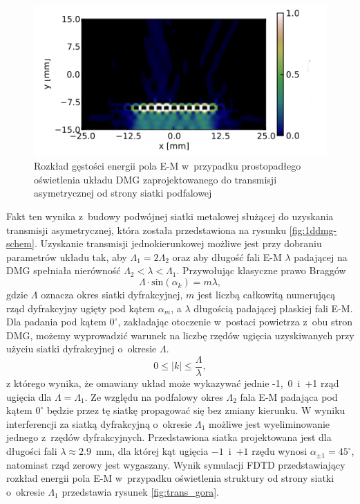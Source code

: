 \begin{figure}[tb]
	\includegraphics[width=\textwidth]{images/thz/opt_letters_dol.png}
	\caption{Rozkład gęstości energii pola E-M w~przypadku prostopadłego oświetlenia układu DMG zaprojektowanego do transmisji asymetrycznej od strony siatki podfalowej~\cite{Stolarek:13} }
	\label{fig:trans_dol}
\end{figure}

Fakt ten wynika z~budowy podwójnej siatki metalowej służącej do uzyskania transmisji asymetrycznej, która została przedstawiona na rysunku \ref{fig:1ddmg-schem}. Uzyskanie transmisji jednokierunkowej możliwe jest przy dobraniu parametrów układu tak, aby $\Lambda_1 = 2\Lambda_2$ oraz aby długość fali E-M $\lambda$ padającej na DMG  spełniała nierówność $\Lambda_2<\lambda<\Lambda_1$. Przywołując klasyczne prawo Braggów
\begin{equation}
	\Lambda \cdot \textrm{sin}(\alpha_k) = m \lambda,
\end{equation}
gdzie $\Lambda$ oznacza okres siatki dyfrakcyjnej, $m$ jest liczbą całkowitą numerującą rząd dyfrakcyjny ugięty pod kątem $\alpha_m$, a $\lambda$ długością padającej płaskiej fali E-M. Dla padania pod kątem $0^{\circ}$, zakładając otoczenie w~postaci powietrza z~obu stron DMG, możemy wyprowadzić warunek na liczbę rzędów ugięcia uzyskiwanych przy użyciu siatki dyfrakcyjnej o~okresie $\Lambda$. 
\begin{equation}
	 0 \le |k| \le \frac { \Lambda }{\lambda},
\end{equation}
z którego wynika, że omawiany układ może wykazywać jednie -1,~0~i~+1 rząd ugięcia dla  $\Lambda=\Lambda_1$. Ze względu na podfalowy okres $\Lambda_2$ fala E-M padająca pod kątem $0^{\circ}$ będzie przez tę siatkę propagować się bez zmiany kierunku.  W wyniku interferencji za siatką dyfrakcyjną o~okresie $\Lambda_1$ możliwe jest wyeliminowanie jednego z~rzędów dyfrakcyjnych. Przedstawiona siatka projektowana jest dla długości fali $\lambda \approx 2.9$~mm, dla której kąt ugięcia $-1$~i~$+1$ rzędu wynosi $\alpha_{\pm 1} = 45^{\circ}$, natomiast rząd zerowy jest wygaszany. Wynik symulacji FDTD przedstawiający rozkład energii pola E-M w~przypadku oświetlenia struktury od strony siatki o~okresie $\Lambda_1$ przedstawia rysunek \ref{fig:trans_gora}.

